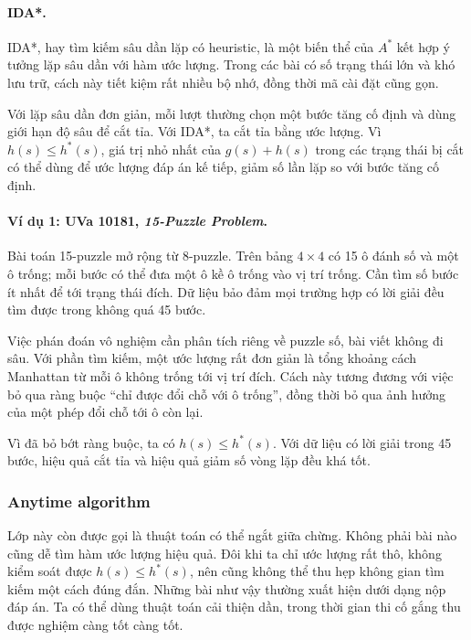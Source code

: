 \documentclass[11pt]{article}
\begin{document}
\paragraph{IDA*.}
IDA*, hay tìm kiếm sâu dần lặp có heuristic, là một biến thể của \(A^*\) kết hợp
ý tưởng lặp sâu dần với hàm ước lượng. Trong các bài có số trạng thái lớn và khó
lưu trữ, cách này tiết kiệm rất nhiều bộ nhớ, đồng thời mã cài đặt cũng gọn.

Với lặp sâu dần đơn giản, mỗi lượt thường chọn một bước tăng cố định và dùng
giới hạn độ sâu để cắt tỉa. Với IDA*, ta cắt tỉa bằng ước lượng. Vì
\(h(s)\le h^*(s)\), giá trị nhỏ nhất của \(g(s)+h(s)\) trong các trạng thái bị
cắt có thể dùng để ước lượng đáp án kế tiếp, giảm số lần lặp so với bước tăng
cố định.

\paragraph{Ví dụ 1: UVa 10181, \emph{15-Puzzle Problem}.}
Bài toán 15-puzzle mở rộng từ 8-puzzle. Trên bảng \(4\times4\) có 15 ô đánh số
và một ô trống; mỗi bước có thể đưa một ô kề ô trống vào vị trí trống. Cần tìm
số bước ít nhất để tới trạng thái đích. Dữ liệu bảo đảm mọi trường hợp có lời
giải đều tìm được trong không quá 45 bước.

Việc phán đoán vô nghiệm cần phân tích riêng về puzzle số, bài viết không đi
sâu. Với phần tìm kiếm, một ước lượng rất đơn giản là tổng khoảng cách Manhattan
từ mỗi ô không trống tới vị trí đích. Cách này tương đương với việc bỏ qua ràng
buộc ``chỉ được đổi chỗ với ô trống'', đồng thời bỏ qua ảnh hưởng của một phép
đổi chỗ tới ô còn lại.

Vì đã bỏ bớt ràng buộc, ta có \(h(s)\le h^*(s)\). Với dữ liệu có lời giải trong
45 bước, hiệu quả cắt tỉa và hiệu quả giảm số vòng lặp đều khá tốt.

\subsubsection{Anytime algorithm}

Lớp này còn được gọi là thuật toán có thể ngắt giữa chừng. Không phải bài nào
cũng dễ tìm hàm ước lượng hiệu quả. Đôi khi ta chỉ ước lượng rất thô, không kiểm
soát được \(h(s)\le h^*(s)\), nên cũng không thể thu hẹp không gian tìm kiếm một
cách đúng đắn. Những bài như vậy thường xuất hiện dưới dạng nộp đáp án. Ta có
thể dùng thuật toán cải thiện dần, trong thời gian thi cố gắng thu được nghiệm
càng tốt càng tốt.
\end{document}
